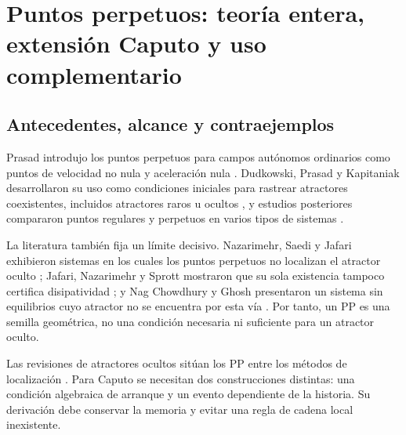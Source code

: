 \section[Puntos perpetuos enteros y extensiones Caputo]
{Puntos perpetuos: teoría entera, extensión Caputo y uso complementario}
\label{sec:perpetual-points}

\HAFOCardPerpetual

\subsection{Antecedentes, alcance y contraejemplos}

Prasad introdujo los puntos perpetuos para campos autónomos ordinarios como
puntos de velocidad no nula y aceleración nula
\cite{Prasad2015Perpetual}. Dudkowski, Prasad y Kapitaniak desarrollaron su uso
como condiciones iniciales para rastrear atractores coexistentes, incluidos
atractores raros u ocultos
\cite{DudkowskiPrasadKapitaniak2015,DudkowskiPrasadKapitaniak2017}, y estudios
posteriores compararon puntos regulares y perpetuos en varios tipos de
sistemas \cite{DudkowskiPrasadKapitaniak2018}.

La literatura también fija un límite decisivo. Nazarimehr, Saedi y Jafari
exhibieron sistemas en los cuales los puntos perpetuos no localizan el
atractor oculto \cite{NazarimehrSaediJafari2017}; Jafari, Nazarimehr y Sprott
mostraron que su sola existencia tampoco certifica disipatividad
\cite{JafariNazarimehrSprott2015}; y Nag Chowdhury y Ghosh presentaron un
sistema sin equilibrios cuyo atractor no se encuentra por esta vía
\cite{NagChowdhuryGhosh2020}. Por tanto, un PP es una semilla geométrica, no
una condición necesaria ni suficiente para un atractor oculto.

Las revisiones de atractores ocultos sitúan los PP entre los métodos de
localización \cite{DudkowskiEtAl2016,GuanXie2025}. Para Caputo se necesitan
dos construcciones distintas: una condición algebraica de arranque y un evento
dependiente de la historia. Su derivación debe conservar la memoria y evitar
una regla de cadena local inexistente.

